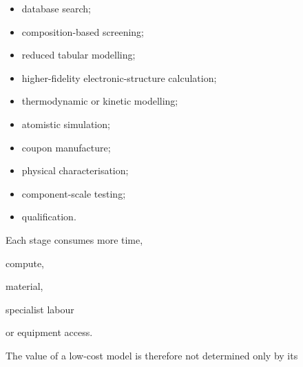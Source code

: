 \documentclass[11pt,a4paper,oneside]{report}
\begin{document}
\begin{itemize}



\item

database search;



\item

composition-based screening;



\item

reduced tabular modelling;



\item

higher-fidelity electronic-structure calculation;



\item

thermodynamic or kinetic modelling;



\item

atomistic simulation;



\item

coupon manufacture;



\item

physical characterisation;



\item

component-scale testing;



\item

qualification.



\end{itemize}



Each stage consumes more time,

compute,

material,

specialist labour

or equipment access.



The value of a low-cost model is therefore not determined only by its
\end{document}
